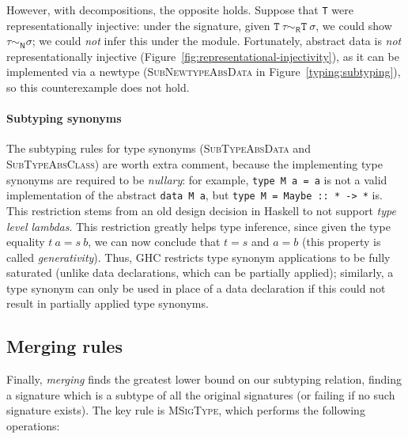 However, with decompositions, the opposite holds. Suppose that \verb|T|
were representationally injective: under the signature, given
$\texttt{T}~\tau \sim_\textsf{R} \texttt{T}~\sigma$, we could
show $\tau \sim_\textsf{N} \sigma$; we could \emph{not} infer
this under the module.
Fortunately, abstract data is \emph{not}
representationally injective (Figure~\ref{fig:representational-injectivity}), as it can be implemented via
a newtype (\textsc{SubNewtypeAbsData} in Figure~\ref{typing:subtyping}),
so this counterexample does not hold.

\paragraph{Subtyping synonyms}
The subtyping rules for type synonyms (\textsc{SubTypeAbsData} and
\textsc{SubTypeAbsClass}) are worth extra comment, because the implementing
type synonyms are required to be \emph{nullary}: for example, \verb|type M a = a|
is not a valid implementation of the abstract \verb|data M a|,
but \verb|type M = Maybe :: * -> *| is.  This restriction
stems from an old design decision in Haskell to not support \emph{type level
lambdas}.  This restriction greatly helps type inference, since given the
type equality $t~a = s~b$, we can now conclude that $t = s$ and $a = b$
(this property is called \emph{generativity}).  Thus, GHC restricts type
synonym applications to be fully saturated (unlike data declarations, which can
be partially applied); similarly, a type synonym can only be used in place
of a data declaration if this could not result in partially applied type
synonyms.

\subsection{Merging rules}
\label{sec:typing/merging}



Finally, \emph{merging} finds the greatest lower bound on our subtyping relation,
finding a signature which is a subtype of all the original signatures (or failing
if no such signature exists).  The key rule is \textsc{MSigType}, which performs
the following operations:

